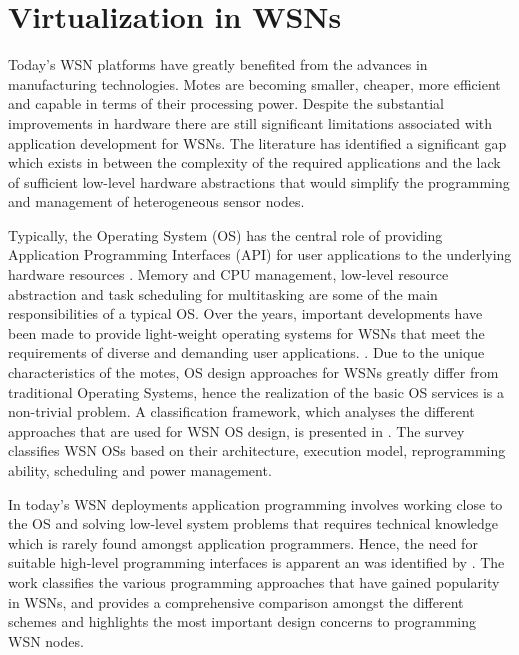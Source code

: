 \section{Virtualization in WSNs}
Today's WSN platforms have greatly benefited from the advances in manufacturing technologies.  Motes are becoming smaller, cheaper, more efficient and capable in terms of their processing power. Despite the substantial improvements in hardware there are still significant limitations associated with application development for WSNs. The literature has identified a significant gap \cite{Fok:2009:AMA:1552297.1552299,Costa:2007:VMA:1304610.1306527,1621014,Levis:2002:MTV:635506.605407} which exists in between the complexity of the required applications and the lack of sufficient low-level hardware abstractions that would simplify the programming and management of heterogeneous sensor nodes. 

Typically, the Operating System (OS) has the central role of providing Application Programming Interfaces (API) for user applications to the underlying hardware resources \cite{hailperin2007operating,Stallings:1998:OSI:272982}. Memory and CPU management, low-level resource abstraction and task scheduling for multitasking are some of the main responsibilities of a typical OS. Over the years, important developments have been made to provide light-weight operating systems for WSNs that meet the requirements of diverse and demanding user applications. \cite{1367266,1630599,bhatti2005mantis,eswaran2005nano,s110605900,Reddy:2009:WSN:1593545.1593549}.
Due to the unique characteristics of the motes, OS design approaches for WSNs greatly differ from traditional Operating Systems, hence the realization of the basic OS services is a non-trivial problem. A classification framework, which analyses the different approaches that are used for WSN OS design, is presented in \cite{Reddy:2009:WSN:1593545.1593549}. The survey classifies WSN OSs based on their architecture, execution model, reprogramming ability, scheduling and power management. 

In today's WSN deployments application programming involves working close to the OS and solving low-level system problems that requires technical knowledge which is rarely found amongst application programmers. Hence, the need for suitable high-level programming interfaces is apparent an was identified by \cite{mottola2011programming}. The work classifies the various programming approaches  that have gained popularity in WSNs, and provides a comprehensive comparison amongst the different schemes and highlights the most important design concerns to programming WSN nodes. 

